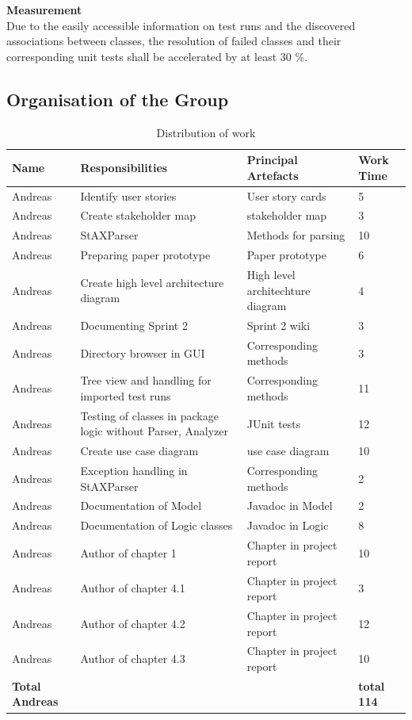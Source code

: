 {\large\textbf{Measurement}}\\ 
Due to the easily accessible information on test runs and the discovered associations between classes, the resolution of failed classes and their corresponding unit tests shall be accelerated by at least 30 \%. 

\newpage
\subsection{Organisation of the Group}

\begin{table}[!h]
  \caption{Distribution of work}
  \centering
  \begin{tabular}{p{2cm}||p{4.2cm}|p{4cm}|l|}
    Name & Responsibilities & Principal Artefacts & Work Time\\
    \hline
    \hline
    Andreas & Identify user stories & User story cards & 5 \\
    \hline
    Andreas & Create stakeholder map & stakeholder map & 3 \\ 
    \hline
    Andreas & StAXParser & Methods for parsing & 10 \\ 
    \hline
    Andreas & Preparing paper prototype & Paper prototype & 6 \\
    \hline
    Andreas & Create high level architecture diagram & High level architechture diagram & 4 \\ 
    \hline
    Andreas & Documenting Sprint 2 & Sprint 2 wiki & 3 \\ 
    \hline 
    Andreas & Directory browser in GUI & Corresponding methods & 3 \\ 
    \hline
    Andreas & Tree view and handling for imported test runs & Corresponding methods & 11 \\ 
    \hline
    Andreas & Testing of classes in package logic without Parser, Analyzer & JUnit tests & 12 \\ 
    \hline 
    Andreas & Create use case diagram & use case diagram & 10 \\ 
    \hline
    Andreas & Exception handling in StAXParser & Corresponding methods & 2 \\ 
    \hline
    Andreas & Documentation of Model & Javadoc in Model & 2 \\ 
    \hline
    Andreas & Documentation of Logic classes & Javadoc in Logic & 8 \\ 
    \hline
    Andreas & Author of chapter 1 & Chapter in project report & 10 \\ 
    \hline
    Andreas & Author of chapter 4.1 & Chapter in project report & 3 \\ 
    \hline
    Andreas & Author of chapter 4.2 & Chapter in project report & 12 \\
    \hline 
    Andreas & Author of chapter 4.3 & Chapter in project report & 10 \\ 
    \hline
    \hline 
    \textbf{Total \newline Andreas} & & & \textbf{total 114}   \\
    \hline
    \hline
  \end{tabular}
\end{table}
